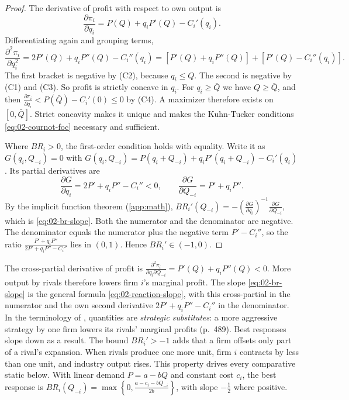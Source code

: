 \begin{proof}
The derivative of profit with respect to own output is
\[
  \frac{\partial \pi_i}{\partial q_i} = P(Q) + q_iP'(Q) - C_i'(q_i) .
\]
Differentiating again and grouping terms,
\[
  \frac{\partial^2 \pi_i}{\partial q_i^2} = 2P'(Q) + q_iP''(Q) - C_i''(q_i)
    = \left[P'(Q) + q_iP''(Q)\right] + \left[P'(Q) - C_i''(q_i)\right] .
\]
The first bracket is negative by (C2), because $q_i \le Q$. The second is negative by (C1) and (C3). So profit is
strictly concave in $q_i$. For $q_i \ge \bar Q$ we have $Q \ge \bar Q$, and then
$\frac{\partial \pi_i}{\partial q_i} < P(\bar Q) - C_i'(0) \le 0$ by (C4). A maximizer therefore exists on
$[0, \bar Q]$. Strict concavity makes it unique and makes the Kuhn-Tucker conditions \eqref{eq:02-cournot-foc}
necessary and sufficient.

Where $BR_i > 0$, the first-order condition holds with equality. Write it as $G(q_i, Q_{-i}) = 0$ with
$G(q_i, Q_{-i}) = P(q_i + Q_{-i}) + q_iP'(q_i + Q_{-i}) - C_i'(q_i)$. Its partial derivatives are
\[
  \frac{\partial G}{\partial q_i} = 2P' + q_iP'' - C_i'' < 0, \qquad \frac{\partial G}{\partial Q_{-i}} = P' + q_iP'' .
\]
By the implicit function theorem (\cref{app:math}), $BR_i'(Q_{-i}) = -\left(\frac{\partial G}{\partial
q_i}\right)^{-1}\frac{\partial G}{\partial Q_{-i}}$, which is \eqref{eq:02-br-slope}. Both the numerator and the denominator are negative. The
denominator equals the numerator plus the negative term $P' - C_i''$, so the ratio
$\frac{P' + q_iP''}{2P' + q_iP'' - C_i''}$ lies in $(0, 1)$. Hence $BR_i' \in (-1, 0)$.
\end{proof}

The cross-partial derivative of profit is $\frac{\partial^2 \pi_i}{\partial q_i \partial Q_{-i}} = P'(Q) +
q_iP''(Q) < 0$. More output by rivals therefore lowers firm $i$'s marginal profit. The slope \eqref{eq:02-br-slope}
is the general formula \eqref{eq:02-reaction-slope}, with this cross-partial in the numerator and the own second
derivative $2P' + q_iP'' - C_i''$ in the denominator. In the terminology of
\citet{BulowGeanakoplosKlemperer1985}, quantities are \emph{strategic substitutes}: a more aggressive strategy by
one firm lowers its rivals' marginal profits (p.~489). Best responses slope down as a result. The bound
$BR_i' > -1$ adds that a firm offsets only part of a rival's expansion. When rivals produce one more unit, firm $i$
contracts by less than one unit, and industry output rises. This property drives every comparative static below.
With linear demand $P = a - bQ$ and constant cost $c_i$, the best response is $BR_i(Q_{-i}) = \max\left\{0,
\frac{a - c_i - bQ_{-i}}{2b}\right\}$, with slope $-\frac{1}{2}$ where positive.

